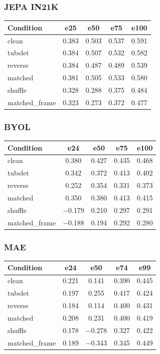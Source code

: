 \documentclass{article}
\begin{document}
\subsubsection{JEPA IN21K}
\begin{center}
\begin{tabular}{lcccc}
\toprule
Condition & e25 & e50 & e75 & e100 \\
\midrule
clean     & 0.383 & 0.503 & 0.537 & 0.591 \\
tubelet   & 0.384 & 0.507 & 0.532 & 0.582 \\
reverse   & 0.384 & 0.487 & 0.489 & 0.539 \\
matched   & 0.381 & 0.505 & 0.533 & 0.580 \\
shuffle   & 0.328 & 0.288 & 0.375 & 0.484 \\
matched\_frame & 0.323 & 0.273 & 0.372 & 0.477 \\
\bottomrule
\end{tabular}
\end{center}

\subsubsection{BYOL}
\begin{center}
\begin{tabular}{lcccc}
\toprule
Condition & e24 & e50 & e75 & e100 \\
\midrule
clean     & 0.380 & 0.427 & 0.435 & 0.468 \\
tubelet   & 0.342 & 0.372 & 0.413 & 0.402 \\
reverse   & 0.252 & 0.354 & 0.331 & 0.373 \\
matched   & 0.350 & 0.380 & 0.413 & 0.415 \\
shuffle   & $-$0.179 & 0.210 & 0.297 & 0.291 \\
matched\_frame & $-$0.188 & 0.194 & 0.292 & 0.280 \\
\bottomrule
\end{tabular}
\end{center}

\subsubsection{MAE}
\begin{center}
\begin{tabular}{lcccc}
\toprule
Condition & e24 & e50 & e74 & e99 \\
\midrule
clean     & 0.221 & 0.141 & 0.390 & 0.445 \\
tubelet   & 0.197 & 0.255 & 0.417 & 0.424 \\
reverse   & 0.184 & 0.114 & 0.400 & 0.431 \\
matched   & 0.208 & 0.231 & 0.400 & 0.419 \\
shuffle   & 0.178 & $-$0.278 & 0.327 & 0.422 \\
matched\_frame & 0.189 & $-$0.343 & 0.345 & 0.449 \\
\bottomrule
\end{tabular}
\end{center}
\end{document}
